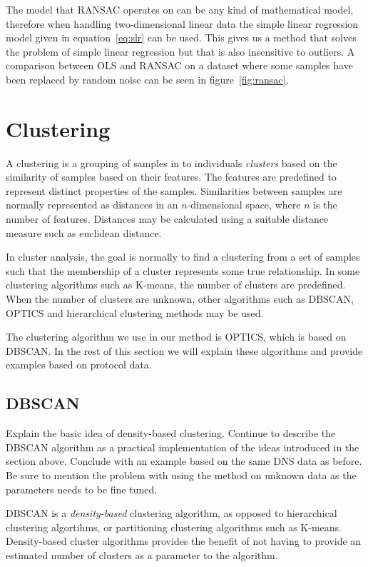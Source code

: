 \documentclass[a4paper]{report}
\begin{document}
The model that RANSAC operates on can be any kind of mathematical model, 
therefore when handling two-dimensional linear data the simple linear
regression model given in equation~\ref{eq:slr} can be used. This gives us a
method that solves the problem of simple linear regression but that is also
insensitive to outliers. A comparison between OLS and RANSAC on a dataset where
some samples have been replaced by random noise can be seen in
figure~\ref{fig:ransac}.

\section{Clustering}
A clustering is a grouping of samples in to individuals \emph{clusters}
based on the similarity of samples based on their features. The features are
predefined to represent distinct properties of the samples. Similarities
between samples are normally represented as distances in an $n$-dimensional
space, where $n$ is the number of features. Distances may be calculated using
a suitable distance measure such as euclidean distance. 

In cluster analysis, the goal is normally to find a clustering from a
set of samples such that the membership of a cluster represents some true
relationship. In some clustering algorithms such as K-means, the number of
clusters are predefined\cite{macqueen67}.
When the number of clusters are unknown, other algorithms such as DBSCAN,
OPTICS and hierarchical clustering methods may be used.

The clustering algorithm we use in our method is OPTICS, which is based on
DBSCAN. In the rest of this section we will explain these algorithms and
provide examples based on protocol data.

\subsection{DBSCAN}
Explain the basic idea of density-based clustering. Continue to describe the
DBSCAN algorithm as a practical implementation of the ideas introduced in the
section above. Conclude with an example based on the same DNS data as before.
Be sure to mention the problem with using the method on unknown data as the
parameters needs to be fine tuned.

DBSCAN is a \emph{density-based} clustering algorithm, as opposed to
hierarchical clustering algortihms, or partitioning clustering algorithms such
as K-means. Density-based cluster algorithms provides the benefit of not
having to provide an estimated number of clusters as a parameter to the
algorithm.
\end{document}
